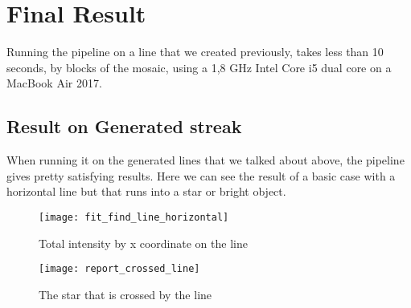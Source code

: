 \documentclass[a4paper,12pt,oneside]{report}
\begin{document}
\chapter{Final Result}


Running the pipeline on a line that we created previously, takes less than 10 seconds, by blocks of the mosaic, using a 1,8 GHz Intel Core i5 dual core
on a MacBook Air 2017. 

\section{Result on Generated streak}
When running it on the generated lines that we talked about above, the pipeline gives pretty satisfying results. Here we can see the result 
of a basic case with a horizontal line but that  runs into a star or bright object.
\begin{figure}[h]
    \begin{minipage}[c]{.47\linewidth}
        \centering
        \texttt{[image: fit\_find\_line\_horizontal]}
        \caption{Total intensity by x coordinate on the line}
        \label{graphHorizontalLine}
    \end{minipage}
    \hfill
    \begin{minipage}[c]{.47\linewidth}
        \centering
        \texttt{[image: report\_crossed\_line]}
        \caption{The star that is crossed by the line}
    \end{minipage}
\end{figure}
\end{document}
